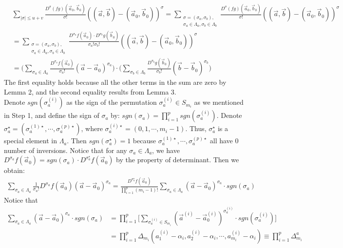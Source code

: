 \documentclass[12pt]{article}
\begin{document}
\begin{align*}
	&\sum_{|\sigma|\leqslant u+v}\frac{D^{\sigma}(fg)(\vec{a}_{0},\vec{b}_{0})}{\sigma!}((\vec{a},\vec{b})-(\vec{a}_{0},\vec{b}_{0}))^{\sigma}=\sum_{\substack{\sigma=(\sigma_{a},\sigma_{b}),\\ \sigma_{a}\in\Lambda_{a},\sigma_{b}\in\Lambda_{b}}}\frac{D^{\sigma}(fg)(\vec{a}_{0},\vec{b}_{0})}{\sigma!}((\vec{a},\vec{b})-(\vec{a}_{0},\vec{b}_{0}))^{\sigma}\\
	&=\sum_{\substack{\sigma=(\sigma_{a},\sigma_{b}),\\ \sigma_{a}\in\Lambda_{a},\sigma_{b}\in\Lambda_{b}}}\frac{D^{\sigma_{a}}f(\vec{a}_{0})\cdot D^{\sigma_{b}}g(\vec{b}_{0})}{\sigma_{a}!\sigma_{b}!}((\vec{a},\vec{b})-(\vec{a}_{0},\vec{b}_{0}))^{\sigma}\\
	&=\Big(\sum_{\sigma_{a}\in\Lambda_{a}}\frac{D^{\sigma_{a}}f(\vec{a}_{0})}{\sigma_{a}!}(\vec{a}-\vec{a}_{0})^{\sigma_{a}}\Big)\cdot\Big(\sum_{\sigma_{b}\in\Lambda_{b}} \frac{D^{\sigma_{b}}g(\vec{b}_{0})}{\sigma_{b}!}(\vec{b}-\vec{b}_{0})^{\sigma_{b}}\Big)
\end{align*}
The first equality holds because all the other terms in the sum are zero by Lemma 2, and the second equality results from Lemma 3.\\
Denote $sgn(\sigma_{a}^{(i)})$ as the sign of the permutation $\sigma_{a}^{(i)}\in S_{m_i}$ as we mentioned in Step 1, and define the sign of $\sigma_{a}$ by: $sgn(\sigma_{a})=\prod_{i=1}^{p}sgn(\sigma_{a}^{(i)})$. Denote $\sigma_{a}^{\star}=(\sigma_{a}^{(1)\star},\cdots,\sigma_{a}^{(p)\star})$, where $\sigma_{a}^{(i)\star}=(0,1,\cdots,m_i-1)$. Thus, $\sigma_{a}^{\star}$ is a special element in $\Lambda_{a}$. Then $sgn(\sigma_{a}^{\star})=1$ because $\sigma_{a}^{(1)\star},\cdots,\sigma_{a}^{(p)\star}$ all have $0$ number of inversions. Notice that for any $\sigma_{a}\in\Lambda_{a}$, we have $D^{\sigma_{a}}f(\vec{a}_{0})=sgn(\sigma_{a})\cdot D^{\sigma_{a}^{\star}}f(\vec{a}_{0})$ by the property of determinant. Then we obtain:
\begin{align*}
	\sum_{\sigma_{a}\in\Lambda_{a}}\frac{1}{\sigma_{a}!}D^{\sigma_{a}}f(\vec{a}_{0})(\vec{a}-\vec{a}_{0})^{\sigma_{a}}=\frac{D^{\sigma_{a}^{\star}}f(\vec{a}_{0})}{\prod_{i=1}^{p}(m_{i}-1)!}\sum_{\sigma_{a}\in\Lambda_{a}}(\vec{a}-\vec{a}_{0})^{\sigma_{a}}\cdot sgn(\sigma_{a})
\end{align*}
Notice that 
\begin{align*}
	\sum_{\sigma_{a}\in\Lambda_{a}}(\vec{a}-\vec{a}_{0})^{\sigma_{a}}\cdot sgn(\sigma_{a})&=\prod_{i=1}^{p}\Big[\sum_{\sigma_{a}^{(i)}\in S_{m_i}}(\vec{a}^{(i)}-\vec{a}_{0}^{(i)})^{\sigma_{a}^{(i)}}\cdot sgn(\sigma_{a}^{(i)})\Big]\\
	&=\prod_{i=1}^{p}\Delta_{m_i}(a_{1}^{(i)}-\alpha_{i},a_{2}^{(i)}-\alpha_{i},\cdots,a_{m_i}^{(i)}-\alpha_{i})\equiv\prod_{i=1}^{p}\Delta_{m_i}^{a}
\end{align*}
\end{document}

